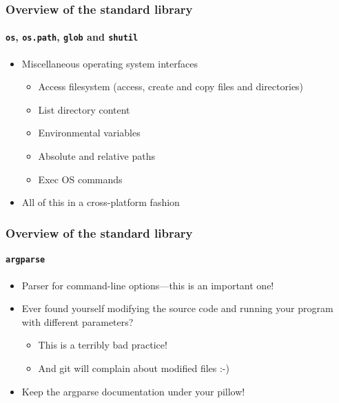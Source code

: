 \documentclass[9pt]{beamer}
\begin{document}
\begin{frame}
  \frametitle{Overview of the standard library}
  \framesubtitle{\texttt{os}, \texttt{os.path}, \texttt{glob} and
    \texttt{shutil}}
  \begin{itemize}
  \item Miscellaneous operating system interfaces
    \begin{itemize}
    \item Access filesystem (access, create and copy files and directories)
    \item List directory content
    \item Environmental variables
    \item Absolute and relative paths
    \item Exec OS commands
    \end{itemize}
  \item \alert{All of this in a cross-platform fashion}
  \end{itemize}
\end{frame}


\begin{frame}
  \frametitle{Overview of the standard library}
  \framesubtitle{\texttt{argparse}}
  \begin{itemize}
  \item \alert{Parser for command-line options---this is an important one!}
  \item Ever found yourself modifying the source code and running your
    program with different parameters?
    \begin{itemize}
    \item This is a terribly bad practice!
    \item And git will complain about modified files :-)
    \end{itemize}
  \item Keep the argparse documentation under your pillow!
  \end{itemize}
\end{frame}
\end{document}

